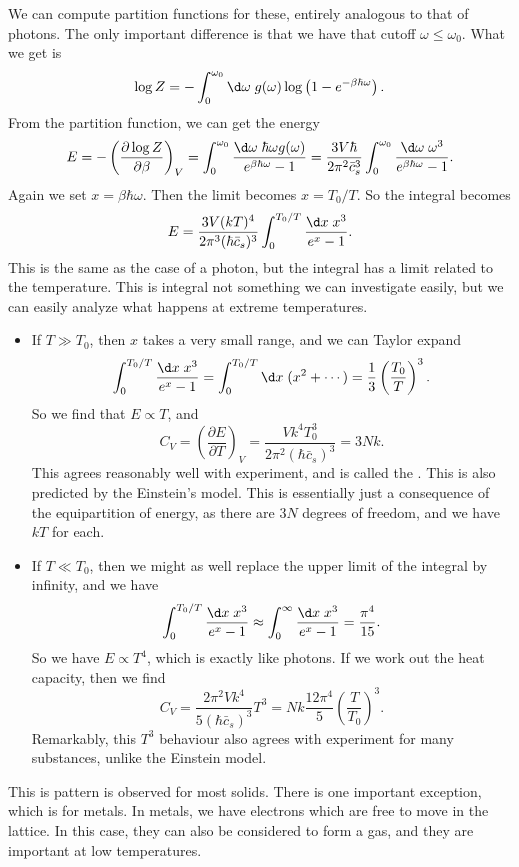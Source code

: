 \documentclass[a4paper]{article}
\begin{document}
We can compute partition functions for these, entirely analogous to that of photons. The only important difference is that we have that cutoff $\omega \leq \omega_0$. What we get is
\[
  \log Z = - \int_0^{\omega_0} \d \omega \; g(\omega) \log\left(1 - e^{-\beta \hbar \omega}\right).
\]
From the partition function, we can get the energy
\[
  E = -\left(\frac{\partial \log Z}{\partial \beta}\right)_V = \int_0^{\omega_0} \frac{\d \omega\; \hbar \omega g(\omega)}{e^{\beta \hbar \omega} - 1} = \frac{3V \hbar}{2\pi^2 \bar{c}_s^3} \int_0^{\omega_0} \frac{\d \omega\; \omega^3}{e^{\beta \hbar \omega} - 1}.
\]
Again we set $x = \beta \hbar \omega$. Then the limit becomes $x = T_0/T$. So the integral becomes
\[
  E = \frac{3V (kT)^4}{2\pi^3 (\hbar \bar{c}_s)^3} \int_0^{T_0/T} \frac{\d x\; x^3}{e^x - 1}.
\]
This is the same as the case of a photon, but the integral has a limit related to the temperature. This is integral not something we can investigate easily, but we can easily analyze what happens at extreme temperatures.
\begin{itemize}
  \item If $T \gg T_0$, then $x$ takes a very small range, and we can Taylor expand
    \[
      \int_0^{T_0/T}\frac{\d x\; x^3}{e^x - 1}= \int_0^{T_0/T} \d x\; (x^2 + \cdots) = \frac{1}{3} \left(\frac{T_0}{T}\right)^3.
    \]
    So we find that $E \propto T$, and
    \[
      C_V = \left(\frac{\partial E}{\partial T}\right)_V = \frac{V k^4 T_0^3}{2\pi^2(\hbar \bar{c}_s)^3} = 3 Nk.
    \]
    This agrees reasonably well with experiment, and is called the .
    This is also predicted by the Einstein's model. This is essentially just a consequence of the equipartition of energy, as there are $3N$ degrees of freedom, and we have $kT$ for each.
  \item If $T \ll T_0$, then we might as well replace the upper limit of the integral by infinity, and we have
    \[
      \int_0^{T_0/T} \frac{\d x\; x^3}{e^x - 1} \approx \int_0^\infty \frac{\d x\; x^3}{e^x - 1} = \frac{\pi^4}{15}.
    \]
    So we have $E \propto T^4$, which is exactly like photons. If we work out the heat capacity, then we find
    \[
      C_V = \frac{2\pi^2 V k^4}{5(\hbar \bar{c}_s)^3} T^3 = Nk \frac{12 \pi^4}{5}\left(\frac{T}{T_0}\right)^3.
    \]
    Remarkably, this $T^3$ behaviour also agrees with experiment for many substances, unlike the Einstein model.
\end{itemize}

This is pattern is observed for most solids. There is one important exception, which is for metals. In metals, we have electrons which are free to move in the lattice. In this case, they can also be considered to form a gas, and they are important at low temperatures.
\end{document}
